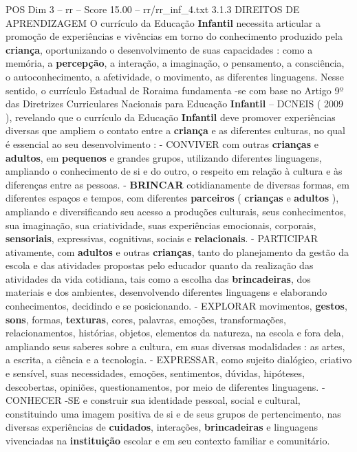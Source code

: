 \begin{textsample}{POS Dim 3 – rr – Score 15.00 – rr/rr\_inf\_4.txt}  \label{ex:f3_pos_229}
3.1.3 DIREITOS DE APRENDIZAGEM O currículo da Educação \textbf{Infantil} necessita articular a promoção de experiências e vivências em torno do conhecimento produzido pela \textbf{criança}, oportunizando o desenvolvimento de suas capacidades : como a memória, a \textbf{percepção}, a interação, a imaginação, o pensamento, a consciência, o autoconhecimento, a afetividade, o movimento, as diferentes linguagens.
Nesse sentido, o currículo Estadual de Roraima fundamenta -se com base no Artigo 9º das Diretrizes Curriculares Nacionais para Educação \textbf{Infantil} – DCNEIS ( 2009 ), revelando que o currículo da Educação \textbf{Infantil} deve promover experiências diversas que ampliem o contato entre a \textbf{criança} e as diferentes culturas, no qual é essencial ao seu desenvolvimento : - CONVIVER com outras \textbf{crianças} e \textbf{adultos}, em \textbf{pequenos} e grandes grupos, utilizando diferentes linguagens, ampliando o conhecimento de si e do outro, o respeito em relação à cultura e às diferenças entre as pessoas. - \textbf{BRINCAR} cotidianamente de diversas formas, em diferentes espaços e tempos, com diferentes \textbf{parceiros} ( \textbf{crianças} e \textbf{adultos} ), ampliando e diversificando seu acesso a produções culturais, seus conhecimentos, sua imaginação, sua criatividade, suas experiências emocionais, corporais, \textbf{sensoriais}, expressivas, cognitivas, sociais e \textbf{relacionais}. - PARTICIPAR ativamente, com \textbf{adultos} e outras \textbf{crianças}, tanto do planejamento da gestão da escola e das atividades propostas pelo educador quanto da realização das atividades da vida cotidiana, tais como a escolha das \textbf{brincadeiras}, dos materiais e dos ambientes, desenvolvendo diferentes linguagens e elaborando conhecimentos, decidindo e se posicionando. - EXPLORAR movimentos, \textbf{gestos}, \textbf{sons}, formas, \textbf{texturas}, cores, palavras, emoções, transformações, relacionamentos, histórias, objetos, elementos da natureza, na escola e fora dela, ampliando seus saberes sobre a cultura, em suas diversas modalidades : as artes, a escrita, a ciência e a tecnologia. - EXPRESSAR, como sujeito dialógico, criativo e sensível, suas necessidades, emoções, sentimentos, dúvidas, hipóteses, descobertas, opiniões, questionamentos, por meio de diferentes linguagens. - CONHECER -SE e construir sua identidade pessoal, social e cultural, constituindo uma imagem positiva de si e de seus grupos de pertencimento, nas diversas experiências de \textbf{cuidados}, interações, \textbf{brincadeiras} e linguagens vivenciadas na \textbf{instituição} escolar e em seu contexto familiar e comunitário.

\end{textsample}
